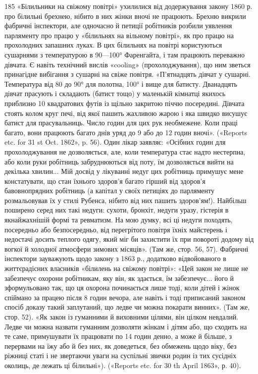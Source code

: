 185 «Білильники на свіжому повітрі» ухилилися від додержування
закону 1860 р. про білильні брехнею, нібито в них жінки вночі не працюють.
Брехню викрили фабричні інспектори, але одночасно й петиції
робітників розбили уявлення парляменту про працю у «білильнях на
вільному повітрі», як про працю на прохолодних запашних луках. В цих
білильнях на повітрі користуються сушарнями з температурою в 90—100°
Фаренгайта, і там працюють переважно дівчата. Є навіть технічний вислів
«cooling» (прохолоджування), що ним зветься принагідне вибігання з
сушарні на свіже повітря. «П’ятнадцять дівчат у сушарні. Температура
від 80 до 90° для полотна, 100° і вище для батисту. Дванадцять дівчат прасують
і складають (батист тощо) у маленькій кімнатці якихось приблизно
10 квадратових футів із щільно закритою піччю посередині. Дівчата стоять
колом круг печі, від якої пашить жахливою жарою і яка швидко висушує
батист для прасувальниць. Число годин для цих рук необмежене. Коли
праці багато, вони працюють багато днів уряд до 9 або до 12 годин вночі».
(«Reports etc. for 31 st Oct. 1862», p. 56). Один лікар заявляє: «Осібних
годин для прохолоджування не дозволяється, але, коли температура стає
надто нестерпна, або коли руки робітниць забруднюються від поту, їм
дозволяється вийти на декілька хвилин... Мій досвід у лікуванні недуг
цих робітниць примушує мене констатувати, що стан їхнього здоров'я
багато гірший від здоров’я бавовнопрядних робітниць (а капітал у своїх
петиціях до парляменту розмальовував їх у стилі Рубенса, нібито від них
пашить здоров’ям!). Найбільш поширено серед них такі недуги: сухоти,
бронхіт, недуги уразу, гістерія в якнайжахнішій формі та ревматизм.
На мою думку, всі ці недуги походять, посередньо або безпосередньо,
від перегрітого повітря їхніх майстерень і недостачі досить теплого одягу,
який міг би захистити їх при повороті додому від вогкої й холодної атмосфери
зимових місяців». (Там же, стор. 56, 57). Фабричні інспектори зауважують
щодо закону з 1863 р., додатково відвойованого в життєрадісних
власників «білилень на свіжому повітрі»: «Цей закон не лише не забезпечує
охорони робітникам, яку він, як здається, їм забезпечує... його й
зформульовано так, що ця охорона починається лише тоді, коли дітей
і жінок спіймано за працею після 8 годин вечора, але навіть і тоді приписаний
законом спосіб доказу такий заплутаний, що ледве чи можна
покарати винних». (Там же, стор. 52). «Як закон із гуманними й виховними
цілями, він цілком невдалий. Ледве чи можна назвати гуманним
дозволяти жінкам і дітям або, що сходить на те саме, примушувати їх
працювати по 14 годин денно, а може й більше, з перервами на їжу або
й без них, як доведеться, без обмежень щодо віку, без ріжниці статі
і не звертаючи уваги на суспільні звички родин із тих сусідніх околиць,
де лежать ці білильні»). («Reports etc. for 30 th April 1863», р. 40).
